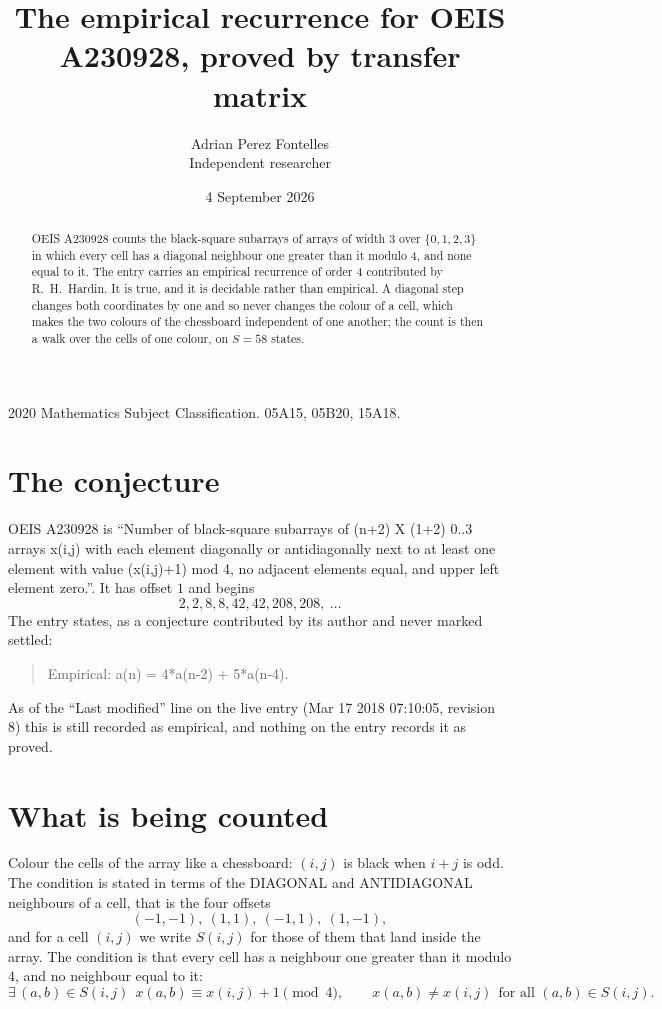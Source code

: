 \documentclass[11pt,a4paper]{article}
\title{The empirical recurrence for OEIS A230928, proved by transfer matrix}
\author{Adrian Perez Fontelles\\ \small Independent researcher}
\date{4 September 2026}
\theoremstyle{plain}
\theoremstyle{definition}
\begin{document}
\maketitle

\begin{abstract}
OEIS A230928 counts the black-square subarrays of arrays of width $3$ over $\{0,1,2,3\}$ in which
every cell has a diagonal neighbour one greater than it modulo 4, and none equal to it. The entry carries an empirical recurrence of order $4$ contributed by
R.~H.~Hardin. It is true, and it is decidable rather than empirical. A diagonal step changes
both coordinates by one and so never changes the colour of a cell, which makes the two colours
of the chessboard independent of one another; the count is then a walk over the cells of one
colour, on $S=58$ states.
\end{abstract}

\noindent\small 2020 Mathematics Subject Classification. 05A15, 05B20, 15A18.\normalsize

\section{The conjecture}

OEIS A230928 is ``Number of black-square subarrays of (n+2) X (1+2) 0..3 arrays x(i,j) with each element diagonally or antidiagonally next to at least one element with value (x(i,j)+1) mod 4, no adjacent elements equal, and upper left element zero.''. It has offset $1$ and begins
\[
2, 2, 8, 8, 42, 42, 208, 208,\ \dots
\]
The entry states, as a conjecture contributed by its author and never marked settled:
\begin{quote}
Empirical: a(n) = 4*a(n-2) + 5*a(n-4).
\end{quote}
As of the ``Last modified'' line on the live entry (Mar 17 2018 07:10:05, revision 8) this is still
recorded as empirical, and nothing on the entry records it as proved.

\section{What is being counted}

Colour the cells of the array like a chessboard: $(i,j)$ is black when $i+j$ is odd. The
condition is stated in terms of the DIAGONAL and ANTIDIAGONAL neighbours of a cell, that is the
four offsets
\[
(-1,-1),\ (1,1),\ (-1,1),\ (1,-1),
\]
and for a cell $(i,j)$ we write $S(i,j)$ for those of them that land inside the array. The
condition is that every cell has a neighbour one greater than it modulo $4$, and no neighbour equal to it:
\[
\exists\,(a,b)\in S(i,j)\ \ x(a,b)\equiv x(i,j)+1 \!\!\pmod{4},\qquad x(a,b)\neq x(i,j)\ \ \text{for all }(a,b)\in S(i,j).
\]
\end{document}
